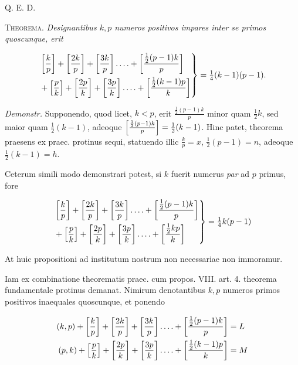 Q. E. D.


\textsc{Theorema.}  \emph{Designantibus $k,p$ numeros positivos impares inter se primos quoscunque, erit}

\[
\begin{aligned}
\left.\begin{aligned}
&\left[\frac kp\right]+\left[\frac{2k}{p}\right]+\left[\frac{3k}{p}\right]\mathinner{.\,.\,.\,.}+\left[\frac{\frac12(p-1)k}{p}\right]\\
&+\left[\frac pk\right]+\left[\frac{2p}{k}\right]+\left[\frac{3p}{k}\right]\mathinner{.\,.\,.\,.}+\left[\frac{\frac12(k-1)p}{k}\right]
\end{aligned}\right\}=\tfrac14(k-1)(p-1).
\end{aligned}
\]

\emph{Demonstr.}  Supponendo, quod licet, $k<p$, erit $\frac{\frac12(p-1)k}{p}$ minor quam $\frac12 k$, sed maior quam $\frac12(k-1)$, adeoque $\left[\frac{\frac12(p-1)k}{p}\right]=\frac12(k-1)$.  Hinc patet, theorema praesens ex praec. protinus sequi, statuendo illic $\frac kp=x$, $\frac12(p-1)=n$, adeoque $\frac12(k-1)=h$.

%
Ceterum simili modo demonstrari potest, si $k$ fuerit numerus \emph{par} ad $p$ primus, fore

\[
\begin{aligned}
\left.\begin{aligned}
&\left[\frac kp\right]+\left[\frac{2k}{p}\right]+\left[\frac{3k}{p}\right]\mathinner{.\,.\,.\,.}+\left[\frac{\frac12(p-1)k}{p}\right]\\
&+\left[\frac pk\right]+\left[\frac{2p}{k}\right]+\left[\frac{3p}{k}\right]\mathinner{.\,.\,.\,.}+\left[\frac{\frac12 kp}{k}\right]
\end{aligned}\right\}=\tfrac14 k(p-1)
\end{aligned}
\]

At huic propositioni ad institutum nostrum non necessariae non immoramur.


Iam ex combinatione theorematis praec. cum propos. VIII. art. 4. theorema fundamentale protinus demanat.  Nimirum denotantibus $k,p$ numeros primos positivos inaequales quoscunque, et ponendo

\[
\begin{aligned}
(k,p)+\left[\frac kp\right]+\left[\frac{2k}{p}\right]+\left[\frac{3k}{p}\right]\mathinner{.\,.\,.\,.}+\left[\frac{\frac12(p-1)k}{p}\right]&=L\\
(p,k)+\left[\frac pk\right]+\left[\frac{2p}{k}\right]+\left[\frac{3p}{k}\right]\mathinner{.\,.\,.\,.}+\left[\frac{\frac12(k-1)p}{k}\right]&=M
\end{aligned}
\]

